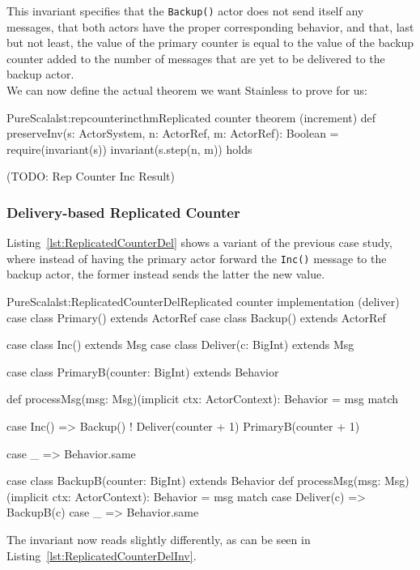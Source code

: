 \documentclass[a4paper,twoside]{article}
\newcommand{\TODO}[1]{\textcolor{YellowOrange}{(TODO: #1)}} %
\newcommand{\RefCode}[1]{Listing~\ref{#1}}
\newcommand{\stt}[1]{\texttt{\small{#1}}}
\begin{document}
This invariant specifies that the \stt{Backup()} actor does not send itself any messages, that both actors have the proper corresponding behavior, and that, last but not least, the value of the primary counter is equal to the value of the backup counter added to the number of messages that are yet to be delivered to the backup actor.\\

We can now define the actual theorem we want Stainless to prove for us:

\begin{Code}{PureScala}{lst:repcounterincthm}{Replicated counter theorem (increment)}
def preserveInv(s: ActorSystem, n: ActorRef, m: ActorRef): Boolean = {
  require(invariant(s))
  invariant(s.step(n, m))
} holds
\end{Code}

\TODO{Rep Counter Inc Result}

\subsubsection{Delivery-based Replicated Counter}

\RefCode{lst:ReplicatedCounterDel} shows a variant of the previous case study, where instead of having the primary actor forward the \stt{Inc()} message to the backup actor, the former instead sends the latter the new value.

\begin{Code}{PureScala}{lst:ReplicatedCounterDel}{Replicated counter implementation (deliver)}
case class Primary() extends ActorRef
case class Backup()  extends ActorRef

case class Inc() extends Msg
case class Deliver(c: BigInt) extends Msg

case class PrimaryB(counter: BigInt) extends Behavior {
  def processMsg(msg: Msg)(implicit ctx: ActorContext): Behavior = msg match {
    case Inc() =>
      Backup() ! Deliver(counter + 1)
      PrimaryB(counter + 1)

    case _ => Behavior.same
  }
}

case class BackupB(counter: BigInt) extends Behavior {
  def processMsg(msg: Msg)(implicit ctx: ActorContext): Behavior = msg match {
    case Deliver(c) => BackupB(c)
    case _          => Behavior.same
  }
}
\end{Code}

The invariant now reads slightly differently, as can be seen in \RefCode{lst:ReplicatedCounterDelInv}.
\end{document}
